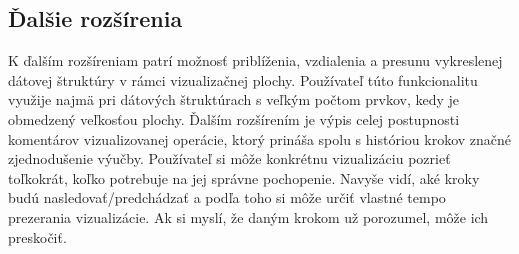 \subsection{Ďalšie rozšírenia}
K ďalším rozšíreniam patrí možnosť priblíženia, vzdialenia a presunu vykreslenej dátovej štruktúry v rámci
vizualizačnej plochy. Používateľ túto funkcionalitu využije najmä pri dátových
štruktúrach s veľkým počtom prvkov, kedy je obmedzený veľkosťou plochy. Ďalším
rozšírením je výpis celej postupnosti komentárov vizualizovanej operácie,
ktorý prináša spolu s históriou krokov značné zjednodušenie
výučby. Používateľ si môže konkrétnu vizualizáciu pozrieť toľkokrát, koľko
potrebuje na jej správne pochopenie. Navyše vidí, aké kroky budú
nasledovať/predchádzať a podľa toho si môže určiť vlastné tempo prezerania
vizualizácie. Ak si myslí, že daným krokom už porozumel, môže ich preskočiť.

